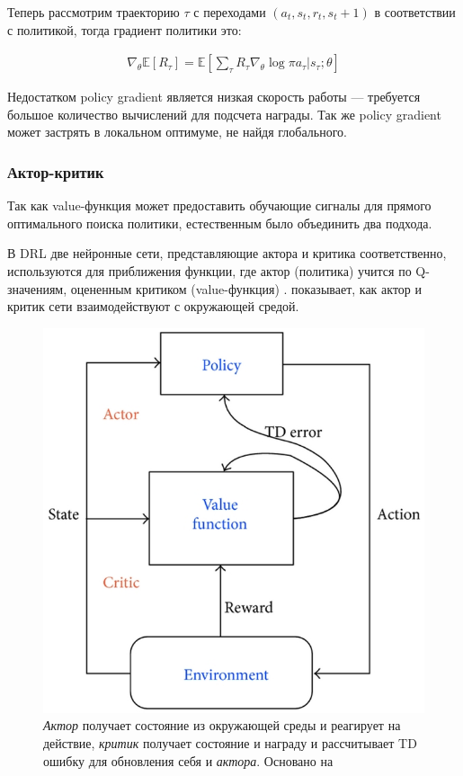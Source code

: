 Теперь рассмотрим траекторию $\tau$ с переходами $(a_t, s_t, r_t, s_t+1)$ в соответствии с политикой, тогда градиент политики это:

\begin{equation}
\label{eq:ch1-likelihood-ratios}
\begin{multlined}
\nabla_\theta \mathbb{E}[R_\tau] = \mathbb{E}[\sum_\tau R_\tau \nabla_\theta \log \pi {a_\tau|s_\tau;\theta}]
\end{multlined}
\end{equation}

Недостатком policy gradient является низкая скорость работы — требуется большое количество вычислений для подсчета награды. Так же policy gradient может застрять в локальном оптимуме, не найдя глобального.

\subsubsection{Актор-критик}

Так как value-функция может предоставить обучающие сигналы для прямого оптимального поиска политики, естественным было объединить два подхода.

В DRL две нейронные сети, представляющие актора и критика соответственно, используются для приближения функции, где актор (политика) учится по Q-значениям, оцененным критиком (value-функция) \cite{Arulkumaran_2017}.  показывает, как актор и критик сети взаимодействуют с окружающей средой.

\begin{figure}[ht!]
	\center
	\includegraphics [scale=0.60] {my_folder/images/ch1/RL-actor-critic.png}
	\caption{{\itshape Актор} получает состояние из окружающей среды и реагирует на действие, {\itshape критик} получает состояние и награду и рассчитывает TD ошибку для обновления себя и {\itshape актора}. Основано на \cite{Arulkumaran_2017}}
	\label{fig:ch1-RL-actor-critic}
\end{figure}

